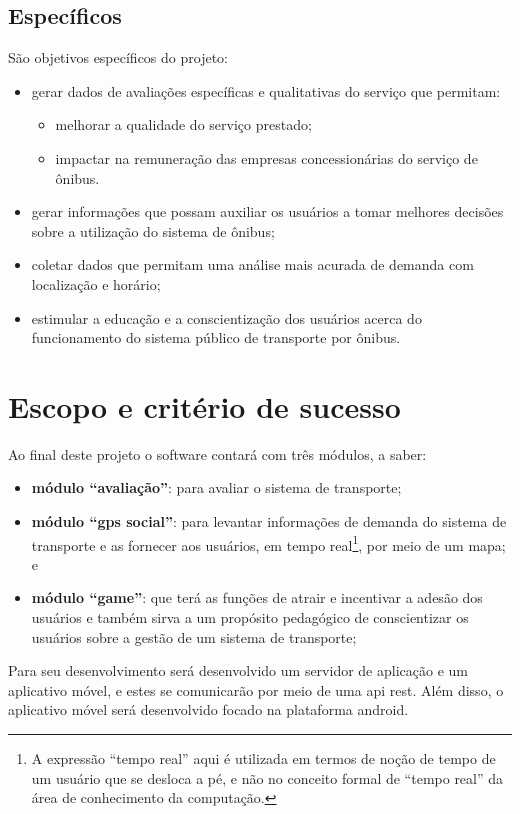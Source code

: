 \clearpage
\subsection{Específicos}\label{subsec:objEspec}
São objetivos específicos do projeto:
\begin{itemize}
\item gerar dados de avaliações específicas e qualitativas do serviço que permitam: \begin{itemize}
\item melhorar a qualidade do serviço prestado;
\item impactar na remuneração das empresas concessionárias do serviço de ônibus.
\end{itemize}
\item gerar informações que possam auxiliar os usuários a tomar melhores decisões sobre a utilização do sistema de ônibus;
\item coletar dados que permitam uma análise mais acurada de demanda com localização e horário;
\item estimular a educação e a conscientização dos usuários acerca do funcionamento do sistema público de transporte por ônibus.
\end{itemize}
	
\section{Escopo e critério de sucesso}\label{sec:Escopo}
	Ao final deste projeto o software contará com três módulos, a saber:
	\begin{itemize}%
		\item \textbf{módulo ``avaliação''}: para avaliar o sistema de transporte;
		\item \textbf{módulo ``gps social''}: para levantar informações de demanda do sistema de transporte e as fornecer aos usuários, em tempo real\footnote{A expressão ``tempo real'' aqui é utilizada em termos de noção de tempo de um usuário que se desloca a pé, e não no conceito formal de ``tempo real'' da área de conhecimento da computação.}, por meio de um mapa; e
		\item \textbf{módulo ``game''}: que terá as funções de atrair e incentivar a adesão dos usuários e também sirva a um propósito pedagógico de conscientizar os usuários sobre a gestão de um sistema de transporte;
	\end{itemize}

Para seu desenvolvimento será desenvolvido um servidor de aplicação e um aplicativo móvel, e estes se comunicarão por meio de uma \gls{api} \gls{rest}. Além disso, o aplicativo móvel será desenvolvido focado na plataforma \gls{android}.

